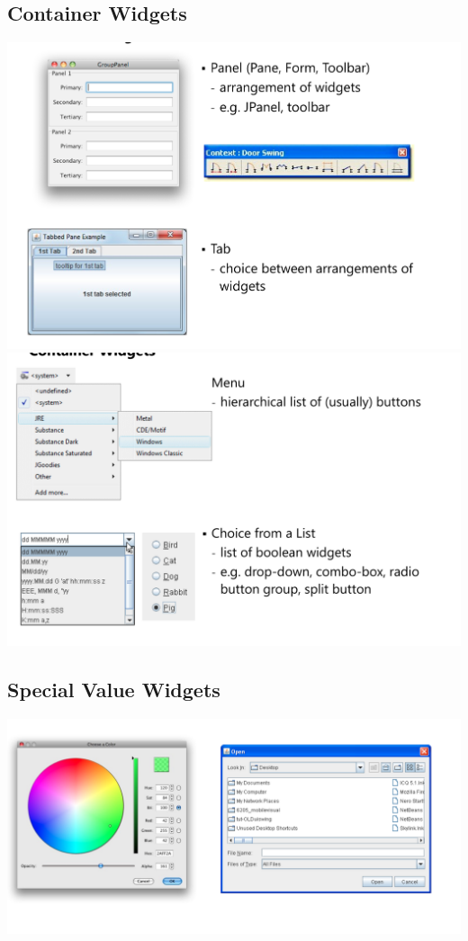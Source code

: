 \documentclass[twoside]{article}
\begin{document}
\subsection{Container Widgets}
\begin{center}
\includegraphics[scale=0.2]{18}\\
\includegraphics[scale=0.2]{19}\\
\end{center}

\subsection{Special Value Widgets}
\begin{center}
\includegraphics[scale=0.2]{20}
\end{center}
\end{document}

